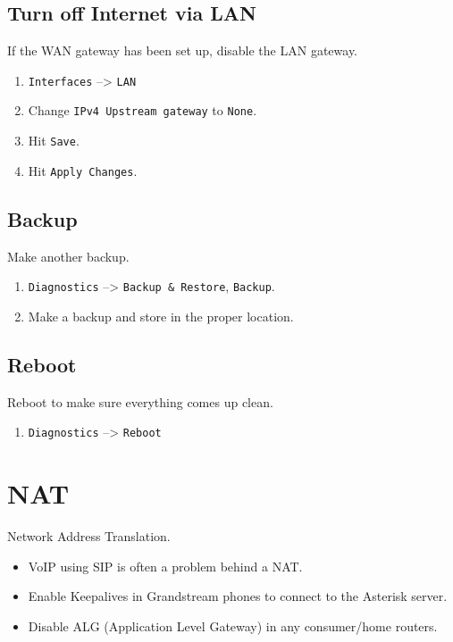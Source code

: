 \subsection{Turn off Internet via LAN}
If the WAN gateway has been set up, disable the LAN gateway.

\begin{enumerate}
 \item \texttt{Interfaces} --> \texttt{LAN}
 \item Change \texttt{IPv4 Upstream gateway} to \texttt{None}.
 \item Hit \texttt{Save}.
 \item Hit \texttt{Apply Changes}.
\end{enumerate}

\subsection{Backup}
Make another backup.

\begin{enumerate}
 \item \texttt{Diagnostics} --> \texttt{Backup \& Restore}, \texttt{Backup}.
 \item Make a backup and store in the proper location.
\end{enumerate}

\subsection{Reboot}
Reboot to make sure everything comes up clean.

\begin{enumerate}
 \item \texttt{Diagnostics} --> \texttt{Reboot}
\end{enumerate}

\section{NAT}
Network Address Translation.

\begin{itemize}
 \item VoIP using SIP is often a problem behind a NAT.
 \item Enable Keepalives in Grandstream phones to connect to the Asterisk server.
 \item Disable ALG (Application Level Gateway) in any consumer/home routers.
\end{itemize}


